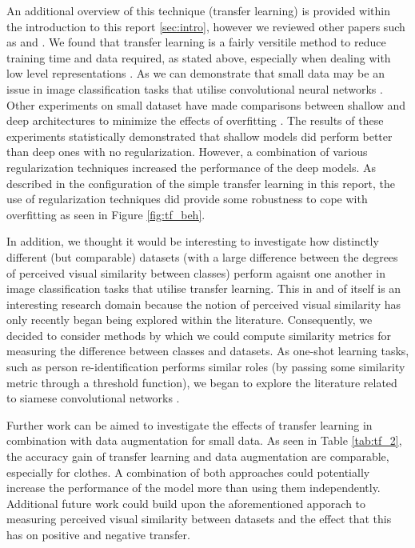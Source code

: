 \documentclass{article}
\begin{document}
An additional overview of this technique (transfer learning) is provided within the introduction to this report \ref{sec:intro}, however we reviewed other papers such as \cite{NIPS2014_5347} and \cite{oquab2014learning}. We found that transfer learning is a fairly versitile method to reduce training time and data required, as stated above, especially when dealing with low level representations \cite{NIPS2014_5347}. As we can demonstrate that small data may be an issue in image classification tasks that utilise convolutional neural networks \cite{interim-report}. Other experiments on small dataset have made comparisons between shallow and deep architectures to minimize the effects of overfitting \citep{pasupa2016comparison}. The results of these experiments statistically demonstrated that shallow models did perform better than deep ones with no regularization. However, a combination of various regularization techniques increased the performance of the deep models. As described in the configuration of the simple transfer learning in this report, the use of regularization techniques did provide some robustness to cope with overfitting as seen in Figure \ref{fig:tf_beh}.

In addition, we thought it would be interesting to investigate how distinctly different (but comparable) datasets (with a large difference between the degrees of perceived visual similarity between classes) perform agaisnt one another in image classification tasks that utilise transfer learning. This in and of itself is an interesting research domain because the notion of perceived visual similarity has only recently began being explored within the literature. Consequently, we decided to consider methods by which we could compute similarity metrics for measuring the difference between classes and datasets. As one-shot learning tasks, such as person re-identification \cite{ahmed2015improved} performs similar roles (by passing some similarity metric through a threshold function), we began to explore the literature related to siamese convolutional networks \cite{koch}.

Further work can be aimed to investigate the effects of transfer learning in combination with data augmentation for small data. As seen in Table \ref{tab:tf_2}, the accuracy gain of transfer learning and data augmentation are comparable, especially for clothes. A combination of both approaches could potentially increase the performance of the model more than using them independently. Additional future work could build upon the aforementioned apporach to measuring perceived visual similarity between datasets and the effect that this has on positive and negative transfer.
\end{document}
